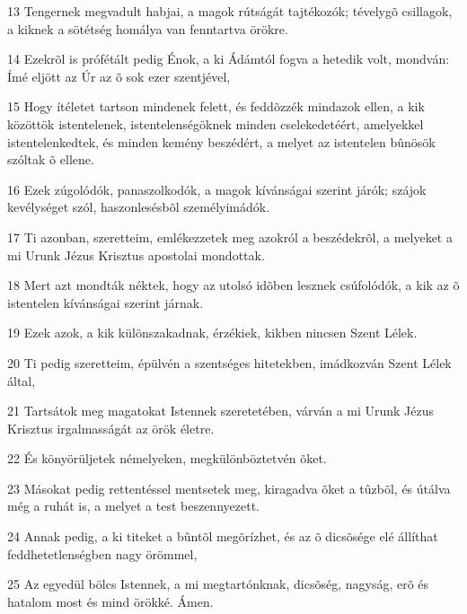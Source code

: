 \par 13 Tengernek megvadult habjai, a magok rútságát tajtékozók; tévelygõ csillagok, a kiknek a sötétség homálya van fenntartva örökre.
\par 14 Ezekrõl is prófétált pedig Énok, a ki Ádámtól fogva a hetedik volt, mondván: Ímé eljött az Úr az õ sok ezer szentjével,
\par 15 Hogy ítéletet tartson mindenek felett, és feddõzzék mindazok ellen, a kik közöttök istentelenek, istentelenségöknek minden cselekedetéért, amelyekkel istentelenkedtek, és minden kemény beszédért, a melyet az istentelen bûnösök szóltak õ ellene.
\par 16 Ezek zúgolódók, panaszolkodók, a magok kívánságai szerint járók; szájok kevélységet szól, haszonlesésbõl személyimádók.
\par 17 Ti azonban, szeretteim, emlékezzetek meg azokról a beszédekrõl, a melyeket a mi Urunk Jézus Krisztus apostolai mondottak.
\par 18 Mert azt mondták néktek, hogy az utolsó idõben lesznek csúfolódók, a kik az õ istentelen kívánságai szerint járnak.
\par 19 Ezek azok, a kik különszakadnak, érzékiek, kikben nincsen Szent Lélek.
\par 20 Ti pedig szeretteim, épülvén a szentséges hitetekben, imádkozván Szent Lélek által,
\par 21 Tartsátok meg magatokat Istennek szeretetében, várván a mi Urunk Jézus Krisztus irgalmasságát az örök életre.
\par 22 És könyörüljetek némelyeken, megkülönböztetvén õket.
\par 23 Másokat pedig rettentéssel mentsetek meg, kiragadva õket a tûzbõl, és útálva még a  ruhát is, a melyet a test beszennyezett.
\par 24 Annak pedig, a ki titeket a bûntõl megõrízhet, és az õ dicsõsége elé állíthat feddhetetlenségben nagy örömmel,
\par 25 Az egyedül bölcs Istennek, a mi megtartónknak, dicsõség, nagyság, erõ és hatalom most és mind örökké. Ámen.


